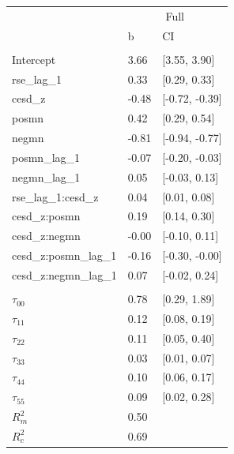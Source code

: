 \documentclass[]{article}
\begin{document}
\begin{table}[H]
\centering
\begin{tabular}{lll}
\toprule
\multicolumn{1}{c}{ } & \multicolumn{2}{c}{Full} \\
\cmidrule(l{2pt}r{2pt}){2-3}
 & b & CI\\
\midrule
\addlinespace[0.3em]
\multicolumn{3}{l}{\textbf{Fixed}}\\
\hspace{1em}Intercept & 3.66 & [3.55, 3.90]\\
\hspace{1em}rse\_lag\_1 & 0.33 & [0.29, 0.33]\\
\hspace{1em}cesd\_z & -0.48 & [-0.72, -0.39]\\
\hspace{1em}posmn & 0.42 & [0.29, 0.54]\\
\hspace{1em}negmn & -0.81 & [-0.94, -0.77]\\
\hspace{1em}posmn\_lag\_1 & -0.07 & [-0.20, -0.03]\\
\hspace{1em}negmn\_lag\_1 & 0.05 & [-0.03, 0.13]\\
\hspace{1em}rse\_lag\_1:cesd\_z & 0.04 & [0.01, 0.08]\\
\hspace{1em}cesd\_z:posmn & 0.19 & [0.14, 0.30]\\
\hspace{1em}cesd\_z:negmn & -0.00 & [-0.10, 0.11]\\
\hspace{1em}cesd\_z:posmn\_lag\_1 & -0.16 & [-0.30, -0.00]\\
\hspace{1em}cesd\_z:negmn\_lag\_1 & 0.07 & [-0.02, 0.24]\\
\addlinespace[0.3em]
\multicolumn{3}{l}{\textbf{Random}}\\
\hspace{1em}$\tau_{00}$ & 0.78 & [0.29, 1.89]\\
\hspace{1em}$\tau_{11}$ & 0.12 & [0.08, 0.19]\\
\hspace{1em}$\tau_{22}$ & 0.11 & [0.05, 0.40]\\
\hspace{1em}$\tau_{33}$ & 0.03 & [0.01, 0.07]\\
\hspace{1em}$\tau_{44}$ & 0.10 & [0.06, 0.17]\\
\hspace{1em}$\tau_{55}$ & 0.09 & [0.02, 0.28]\\
$R^2_m$ & 0.50 & \\
$R^2_c$ & 0.69 & \\
\bottomrule
\end{tabular}
\end{table}
\end{document}
